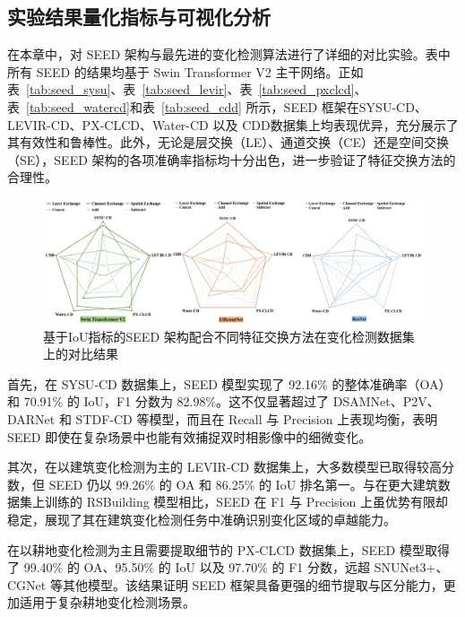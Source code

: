 \subsection{实验结果量化指标与可视化分析}
在本章中，对 SEED 架构与最先进的变化检测算法进行了详细的对比实验。表中所有 SEED 的结果均基于 Swin Transformer V2 主干网络。正如表~\ref{tab:seed_sysu}、表~\ref{tab:seed_levir}、表~\ref{tab:seed_pxclcd}、表~\ref{tab:seed_watercd}和表~\ref{tab:seed_cdd} 所示，SEED 框架在SYSU-CD、LEVIR-CD、PX-CLCD、Water-CD 以及 CDD数据集上均表现优异，充分展示了其有效性和鲁棒性。此外，无论是层交换（LE）、通道交换（CE）还是空间交换（SE），SEED 架构的各项准确率指标均十分出色，进一步验证了特征交换方法的合理性。


\begin{figure}[!htbp]
    \centering
    \includegraphics[width=\textwidth]{paper_figures/变化检测任务基础范式设计/seed_rader_image.png} %
    \caption{基于IoU指标的SEED 架构配合不同特征交换方法在变化检测数据集上的对比结果}
    \label{fig:seed_rader_image}
\end{figure}

首先，在 SYSU‐CD 数据集上，SEED 模型实现了 92.16\% 的整体准确率（OA）和 70.91\% 的 IoU，F1 分数为 82.98\%。这不仅显著超过了 DSAMNet、P2V、DARNet 和 STDF‐CD 等模型，而且在 Recall 与 Precision 上表现均衡，表明 SEED 即使在复杂场景中也能有效捕捉双时相影像中的细微变化。

其次，在以建筑变化检测为主的 LEVIR‐CD 数据集上，大多数模型已取得较高分数，但 SEED 仍以 99.26\% 的 OA 和 86.25\% 的 IoU 排名第一。与在更大建筑数据集上训练的 RSBuilding 模型相比，SEED 在 F1 与 Precision 上虽优势有限却稳定，展现了其在建筑变化检测任务中准确识别变化区域的卓越能力。

在以耕地变化检测为主且需要提取细节的 PX‐CLCD 数据集上，SEED 模型取得了 99.40\% 的 OA、95.50\% 的 IoU 以及 97.70\% 的 F1 分数，远超 SNUNet3+、CGNet 等其他模型。该结果证明 SEED 框架具备更强的细节提取与区分能力，更加适用于复杂耕地变化检测场景。  


